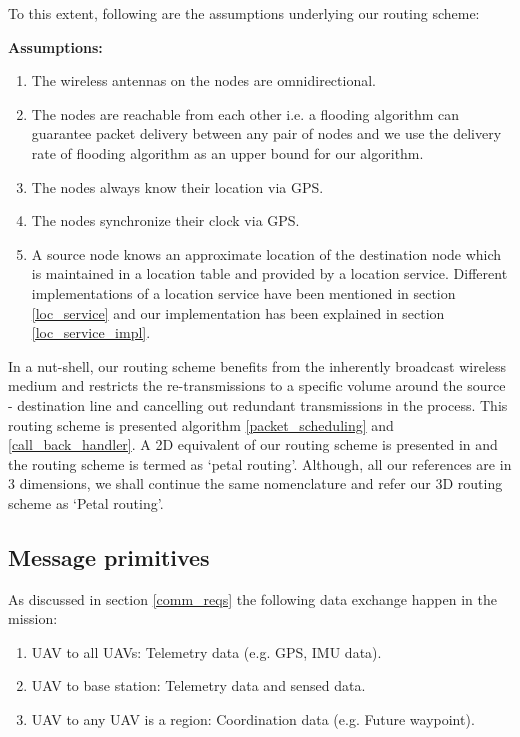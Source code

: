 To this extent, following are the assumptions underlying our routing scheme:

\textbf{Assumptions:}
\begin{enumerate}
\item The wireless antennas on the nodes are omnidirectional.
\item The nodes are reachable from each other i.e. a flooding algorithm can guarantee packet delivery between any pair of nodes and we use the delivery rate of flooding algorithm as an upper bound for our algorithm.
\item The nodes always know their location via GPS. 
\item The nodes synchronize their clock via GPS.
\item A source node knows an approximate location of the destination node which is maintained in a location table and provided by a location service. Different implementations of a location service have been mentioned in section \ref{loc_service} and our implementation has been explained in section \ref{loc_service_impl}. 
\end{enumerate}

In a nut-shell, our routing scheme benefits from the inherently broadcast wireless medium and restricts the re-transmissions to a specific volume around the source - destination line and cancelling out redundant transmissions in the process. This routing scheme is presented algorithm \ref{packet_scheduling} and \ref{call_back_handler}. A 2D equivalent of our routing scheme is presented in \cite{6133499} and the routing scheme is termed as `petal routing'. Although, all our references are in 3 dimensions, we shall continue the same nomenclature and refer our 3D routing scheme as `Petal routing'.


\subsection{Message primitives} \label{message_primitives}

As discussed in section \ref{comm_reqs} the following data exchange happen in the mission:
\begin{enumerate}
    \item UAV to all UAVs: Telemetry data (e.g. GPS, IMU data).
    \item UAV to base station: Telemetry data and sensed data.
    \item UAV to any UAV is a region: Coordination data (e.g. Future waypoint).
\end{enumerate}

